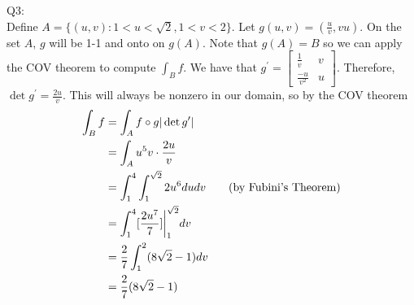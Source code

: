 \documentclass[letterpaper]{article}
\begin{document}
\noindent Q3: \\ Define $A = \{ (u,v): 1< u <\sqrt{2} , 1<v<2 \}$. Let $g(u,v) = (\frac{u}{v},vu)$. On the set $A$, $g$ will be 1-1 and onto on $g(A)$. Note that $g(A)=B$ so we can apply the COV theorem to compute $\int_B f$. 
We have that $g^\prime = \begin{bmatrix} \frac{1}{v} & v \\ \frac{-u}{v^2} & u \end{bmatrix}$. Therefore, $\det g^\prime = \frac{2u}{v}$. This will always be nonzero in our domain, so by the COV theorem 
\begin{align*}
    \int_B f & = \int_A f\circ g |\det g^\prime|
    \\ & = \int_A u^5 v \cdot \frac{2u}{v}
    \\ & = \int_1^4 \int_1^{\sqrt{2}} 2u^6 \space du dv \tag{by Fubini's Theorem}
    \\ & = \int_1^4 [\frac{2u^7}{7}]\bigg|_1^{\sqrt{2}} \space dv
    \\ & = \frac{2}{7}\int_1^2 (8\sqrt2-1) dv
    \\ & = \frac{2}{7}(8\sqrt{2}-1) 
\end{align*}
\end{document}
